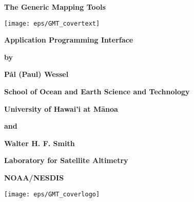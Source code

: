 \documentclass{report}
\begin{document}

\pagestyle{headings}

\thispagestyle{empty}

\begin{center}
\huge
\textbf{The Generic Mapping Tools}\par 
\vspace{0.5\baselineskip}

\texttt{[image: eps/GMT\_covertext]} 

\huge
\textbf{\GMTDOCVERSION}\par 
\vspace{0.25\baselineskip}

\Huge
\textbf{Application Programming Interface}\par 

\large
\vspace{0.75\baselineskip}
\textbf{by}\par 
\vspace{0.75\baselineskip}

\huge
\textbf{P\aa l (Paul) Wessel}\par 
\vspace{0.5\baselineskip}

\Large
\textbf{School of Ocean and Earth Science and Technology}\par 
\textbf{University of Hawai'i at M\={a}noa}\par 

\large
\vspace{0.75\baselineskip}
\textbf{and}\par 
\vspace{0.75\baselineskip}

\huge
\textbf{Walter H. F. Smith}\par 
\vspace{0.5\baselineskip}

\Large
\textbf{Laboratory for Satellite Altimetry}\par 
\textbf{NOAA/NESDIS}\par 
\vspace{0.5\baselineskip}

\large
\textbf{\GMTDOCDATE}\par 
\vspace{\baselineskip}

\texttt{[image: eps/GMT\_coverlogo]}

\end{center}
\clearpage

\thispagestyle{headings}
\end{document}
